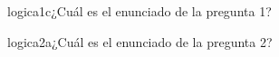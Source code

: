 \documentclass{article}
\begin{document}
\begin{question}{1}{logica}{1}{c}{¿Cuál es el enunciado de la pregunta 1?}
\end{question}

\begin{question}{2}{logica}{2}{a}{¿Cuál es el enunciado de la pregunta 2?}
\end{question}

\end{document}
